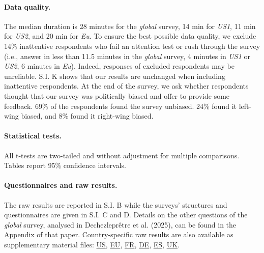 \documentclass[12pt,english]{article}
\begin{document}
\begin{small}
\paragraph{\small Data quality.} %
The median duration is 28 minutes for the \textit{global} survey, 14 min for \textit{US1}, 11 min for \textit{US2}, and 20 min for \textit{Eu}. To ensure the best possible data quality, we exclude 14\% inattentive respondents who fail an attention test or rush through the survey (i.e., answer in less than 11.5 minutes in the \textit{global} survey, 4 minutes in \textit{US1} or \textit{US2}, 6 minutes in \textit{Eu}). Indeed, responses of excluded respondents may be unreliable. S.I. K 
shows that our results are unchanged when including inattentive respondents. %
At the end of the survey, we ask whether respondents thought that our survey was politically biased and offer to provide some feedback. 69\% of the respondents found the survey unbiased. 24\% found it left-wing biased, and 8\% found it right-wing biased.

\paragraph{\small Statistical tests.}
All t-tests are two-tailed and without adjustment for multiple comparisons. Tables report 95\% confidence intervals. 

\paragraph{\small Questionnaires and raw results.} %
The raw results are reported in S.I. B %
while the surveys' structures and questionnaires are given in S.I. C and D. %
Details on the other questions of the \textit{global} survey, analysed in Dechezleprêtre et al. (2025), can be found in the Appendix of that paper.\citep{dechezlepretre_fighting_nodate} Country-specific raw results are also available as supplementary material files:  \href{https://github.com/bixiou/international_attitudes_toward_global_policies/raw/main/paper/app_desc_stats_US.pdf}{US}, \href{https://github.com/bixiou/international_attitudes_toward_global_policies/raw/main/paper/app_desc_stats_EU.pdf}{EU}, \href{https://github.com/bixiou/international_attitudes_toward_global_policies/raw/main/paper/app_desc_stats_FR.pdf}{FR}, \href{https://github.com/bixiou/international_attitudes_toward_global_policies/raw/main/paper/app_desc_stats_DE.pdf}{DE}, \href{https://github.com/bixiou/international_attitudes_toward_global_policies/raw/main/paper/app_desc_stats_ES.pdf}{ES}, \href{https://github.com/bixiou/international_attitudes_toward_global_policies/raw/main/paper/app_desc_stats_UK.pdf}{UK}. %


\end{small}
\end{document}
